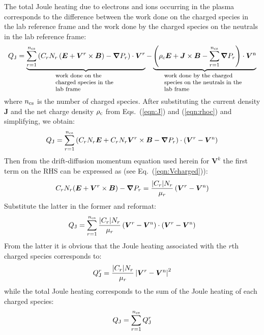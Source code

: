 \documentclass{warpdoc}
\newcommand{\ncs}{{n_{\rm cs}}}
\renewcommand{\vec}[1]{\bm{#1}}
\begin{document}
The total Joule heating due to electrons and ions occurring in the plasma corresponds to the difference between the work done on the charged species in the lab reference frame and the work done by the charged species on the neutrals in the lab reference frame:
%
\begin{equation}
 Q_{\rm J} = \underbrace{  \sum_{r=1}^\ncs \left( C_r N_r \left( \vec{E}+\vec{V}^r \times\vec{B}\right)  - \vec{\nabla} P_r \right)\cdot \vec{V}^r}_{\textrm{\begin{minipage}{3cm}\flushleft \footnotesize work done on the charged species in the lab frame\end{minipage}}} 
- \underbrace{\left(\rho_{\rm c} \vec{E} + \vec{J}\times\vec{B} -\sum_{r=1}^\ncs \vec{\nabla} P_r \right)\cdot \vec{V}^{\rm n}}_{\textrm{\begin{minipage}{4cm}\flushleft \footnotesize work done by the charged species on the neutrals in the lab frame\end{minipage}}}
\label{eqn:JouleHeatingDefinition}
\end{equation}
%
where $n_{\rm cs}$ is the number of charged species. After substituting the current density $\vec{J}$ and the net charge density $\rho_{\rm c}$ from Eqs.\ (\ref{eqn:J}) and (\ref{eqn:rhoc})  and simplifying, we obtain: 
%
\begin{equation}
 Q_{\rm J} = \sum_{r=1}^\ncs   \left(C_r N_r \vec{E}+C_r N_r \vec{V}^r\times \vec{B}-\vec{\nabla}P_r\right) \cdot  \left( \vec{V}^r -\vec{V}^{\rm n} \right)
\end{equation}
%
Then from the drift-diffusion momentum equation used herein for $\vec{V}^k$ the first term on the RHS can be expressed as (see Eq.\ (\ref{eqn:Vcharged})):
%
\begin{equation}
 C_r N_r (\vec{E}+\vec{V}^r\times\vec{B})  -\vec{\nabla} P_r = \frac{|C_r| N_r}{\mu_r} \left(\vec{V}^r-\vec{V}^{\rm n}\right)
\end{equation}
%
Substitute the latter in the former and reformat:
%
\begin{equation}
 Q_{\rm J} = \sum_{r=1}^\ncs   \frac{|C_r| N_r}{\mu_r} \left(\vec{V}^r-\vec{V}^{\rm n}\right) \cdot  \left( \vec{V}^r -\vec{V}^{\rm n} \right)
\end{equation}
%
From the latter it is obvious that the Joule heating associated with the $r$th charged species corresponds to:
%
\begin{equation}
 Q_{\rm J}^r =    \frac{|C_r| N_r}{\mu_r} \left|\vec{V}^r-\vec{V}^{\rm n}\right|^2 
\label{eqn:QJoulespecies}
\end{equation}
%
while the total Joule heating corresponds to the sum of the Joule heating of each charged species:
%
\begin{equation}
 Q_{\rm J} = \sum_{r=1}^\ncs  Q_{\rm J}^r
\label{eqn:QJoule}
\end{equation}
%
\end{document}
